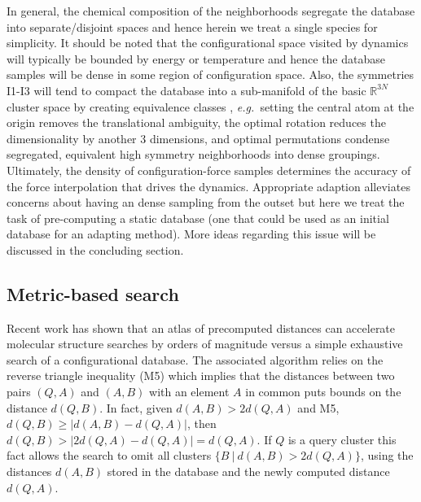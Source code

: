 \documentclass[journal=jctcce,manuscript=article]{achemso}
\newcommand{\eg}{{\it e.g.\ }}
\newcommand{\Rbb}{\mathbb{R}}
\begin{document}
In general, the chemical composition of the neighborhoods segregate the database into separate/disjoint spaces and hence herein we treat a single species for simplicity.
It should be noted that the configurational space visited by dynamics will typically be bounded by energy or temperature and hence the database samples will be dense in some region of configuration space.
Also, the symmetries I1-I3 will tend to compact the database into a sub-manifold of the basic $\Rbb^{3N}$ cluster space by creating equivalence classes \cite{Steipe2002}, \eg setting the central atom at the origin removes the translational ambiguity, the optimal rotation reduces the dimensionality by another 3 dimensions, and optimal permutations condense segregated, equivalent high symmetry neighborhoods into dense groupings.
Ultimately, the density of configuration-force samples determines the accuracy of the force interpolation that drives the dynamics.
Appropriate adaption alleviates concerns about having an dense sampling from the outset but here we treat the task of pre-computing a static database (one that could be used as an initial database for an adapting method).
More ideas regarding this issue will be discussed in the concluding section.


\subsection{Metric-based search} \label{sec:metric_search}

Recent work \cite{Fogolari2012} has shown that an atlas of precomputed distances can accelerate molecular structure searches by orders of magnitude versus a simple exhaustive search of a configurational database.
The associated algorithm relies on the reverse triangle inequality (M5) which implies that the distances between two pairs $(Q,A)$ and $(A,B)$ with an element $A$ in common puts bounds on the distance $d(Q,B)$.  
In fact, given $d(A,B) > 2d(Q,A)$ and M5, $d(Q,B) \ge |d(A,B)-d(Q,A)|$, then $d(Q,B) > |2d(Q,A)-d(Q,A)| = d(Q,A)$.
If $Q$ is a query cluster this fact allows the search to omit all clusters $\{ B \ | \ d(A,B) > 2d(Q,A)\}$, using the distances $d(A,B)$ stored in the database and the newly computed distance $d(Q,A)$.
\end{document}
